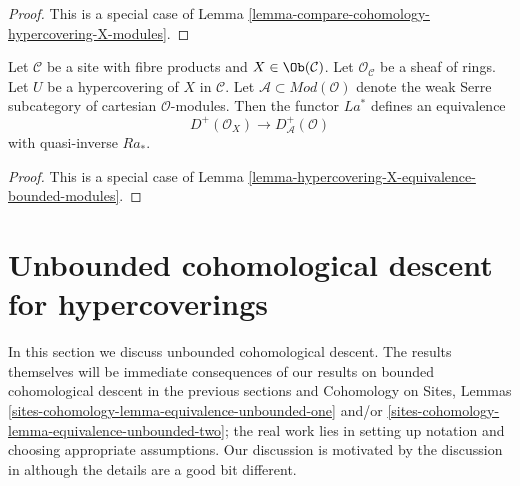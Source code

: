 \begin{proof}
This is a special case of
Lemma \ref{lemma-compare-cohomology-hypercovering-X-modules}.
\end{proof}

\begin{lemma}
\label{lemma-hypercovering-X-simple-equivalence-bounded-modules}
Let $\mathcal{C}$ be a site with fibre products and $X \in \Ob(\mathcal{C})$.
Let $\mathcal{O}_\mathcal{C}$ be a sheaf of rings.
Let $U$ be a hypercovering of $X$ in $\mathcal{C}$.
Let $\mathcal{A} \subset \textit{Mod}(\mathcal{O})$
denote the weak Serre subcategory of cartesian $\mathcal{O}$-modules.
Then the functor $La^*$ defines an equivalence
$$
D^+(\mathcal{O}_X) \longrightarrow D_\mathcal{A}^+(\mathcal{O})
$$
with quasi-inverse $Ra_*$.
\end{lemma}

\begin{proof}
This is a special case of
Lemma \ref{lemma-hypercovering-X-equivalence-bounded-modules}.
\end{proof}







\section{Unbounded cohomological descent for hypercoverings}
\label{section-unbounded-cohomological-descent}

\noindent
In this section we discuss unbounded cohomological descent.
The results themselves will be immediate consequences of
our results on bounded cohomological descent in the previous
sections and Cohomology on Sites, Lemmas
\ref{sites-cohomology-lemma-equivalence-unbounded-one} and/or
\ref{sites-cohomology-lemma-equivalence-unbounded-two}; the real work lies
in setting up notation and choosing appropriate assumptions.
Our discussion is motivated by the discussion in \cite{six-I}
although the details are a good bit different.

